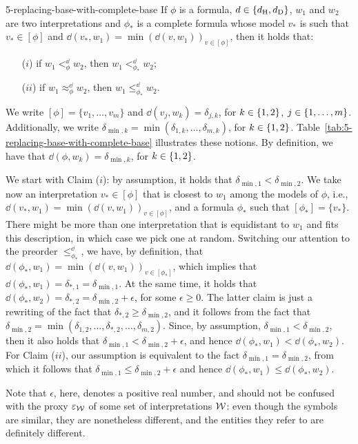 \begin{lem}{}{5-replacing-base-with-complete-base}
	If $\phi$ is a formula, 
	$d\in\{{d_{\operatorname{H}},d_{\operatorname{D}}}\}$, 
	$w_1$ and $w_2$ are two interpretations
	and $\phi_\ast$ is a complete formula whose model $v_\ast$ is such that 
	$v_\ast\in[\phi]$ and $\dd(v_\ast,w_1)=\min(\dd(v,w_1))_{v\in[\phi]}$,
	then it holds that:
	\begin{itemize}
		\item[($i$)] if $w_1<^\dd_\phi w_2$, then $w_1<^\dd_{\phi_\ast}w_2$;
		\item[($ii$)] if $w_1\approx^\dd_\phi w_2$, then $w_1\le^\dd_{\phi_\ast}w_2$.
	\end{itemize}	
\end{lem}
\begin{prf*}{}{}%
	We write $[\phi]=\{v_1,\dots,v_m\}$ 
	and $\dd(v_j,w_k)=\delta_{j,k}$, for $k\in\{{1,2}\}$, $j\in\{{1,\dots,m}\}$.
	Additionally, we write $\delta_{\min,k}=\min(\delta_{1,k},\dots,\delta_{m,k})$, for $k\in\{{1,2}\}$.
	Table~\ref{tab:5-replacing-base-with-complete-base} illustrates these notions.
	By definition, we have that $\dd(\phi,w_k)=\delta_{\min,k}$, for $k\in\{{1,2}\}$.
	
	We start with Claim ($i$): 
	by assumption, it holds that $\delta_{\min,1}<\delta_{\min,2}$.
	We take now an interpretation $v_\ast\in[\phi]$ 
	that is closest to $w_1$ among the models of $\phi$,
	i.e., $\dd(v_\ast,w_1)=\min(\dd(v,w_1))_{v\in[\phi]}$,
	and a formula $\phi_\ast$ such that $[\phi_\ast]=\{v_\ast\}$.
	There might be more than one interpretation that is equidistant to $w_1$ and fits this description,
	in which case we pick one at random.
	Switching our attention to the preorder 
	$\le^{\dd}_{\phi_\ast}$,
	we have, by definition, that
	$\dd(\phi_\ast,w_1)=\min(\dd(v,w_1))_{v\in[\phi_{\ast}]}$,
	which implies that $\dd(\phi_\ast,w_1)=\delta_{\ast,1}=\delta_{\min,1}$.
	At the same time, it holds that 
	$\dd(\phi_\ast,w_2)=\delta_{\ast,2}=\delta_{\min,2}+\epsilon$, for some $\epsilon\geq 0$.
	The latter claim is just a rewriting of the fact that $\delta_{\ast, 2}\geq\delta_{\min,2}$, 
	and it follows from the fact that $\delta_{\min,2}=\min(\delta_{1,2},\dots,\delta_{\ast,2},\dots,\delta_{m,2})$.
	Since, by assumption, $\delta_{\min,1}<\delta_{\min,2}$,
	then it also holds that $\delta_{\min,1}<\delta_{\min,2}+\epsilon$,
	and hence $\dd(\phi_\ast,w_1)<\dd(\phi_\ast,w_2)$.
	For Claim ($ii$), our assumption is equivalent to the fact $\delta_{\min,1}=\delta_{\min,2}$,
	from which it follows that $\delta_{\min,1}\leq\delta_{\min,2}+\epsilon$
	and hence $\dd(\phi_\ast,w_1)\leq \dd(\phi_\ast,w_2)$.

	Note that $\epsilon$, here, denotes a positive real number, and should not be confused with the proxy $\varepsilon_{\mathcal{W}}$
	of some set of interpretations $\mathcal{W}$: even though the symbols are similar, they are nonetheless different,
	and the entities they refer to are definitely different.
\end{prf*}

